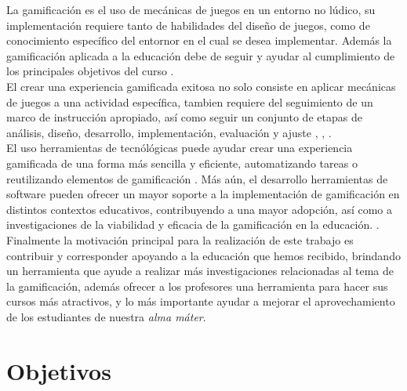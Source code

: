 
 \noindent La gamificación es el uso de mecánicas de juegos en un entorno no lúdico, su implementación requiere
 tanto de habilidades del diseño de juegos, como de conocimiento específico del entornor en el cual se desea
 implementar. Además la gamificación aplicada a la educación debe de seguir y ayudar al cumplimiento de los
 principales objetivos del curso \cite{ForTheWin}.\\ %


 \noindent El crear una experiencia gamificada exitosa no solo consiste en aplicar mecánicas de juegos a una
 actividad específica, tambien requiere del seguimiento de un marco de instrucción apropiado, así como seguir
 un conjunto de etapas de análisis, diseño, desarrollo, implementación, evaluación y ajuste
 \cite[p. 39]{Octalysis}, \cite[p. 1110]{GamInE-Learning}, \cite{ForTheWin}.\\


 \noindent El uso herramientas de tecnólógicas puede ayudar crear una experiencia gamificada de una
 forma más sencilla y eficiente, automatizando tareas o reutilizando elementos de gamificación \cite{Wood-Reiners}.
 Más aún, el desarrollo herramientas de software pueden ofrecer un mayor soporte a la implementación de
 gamificación en distintos contextos educativos, contribuyendo a una mayor adopción, así como a investigaciones
 de la viabilidad y eficacia de la gamificación en la educación. \cite[p. 10]{mappingStudy}.\\


 \noindent Finalmente la motivación principal para la realización de este trabajo es contribuir y corresponder
 apoyando a la educación que hemos recibido, brindando un herramienta que ayude a realizar más investigaciones
 relacionadas al tema de la gamificación, además ofrecer a los profesores una herramienta para hacer sus cursos más
 atractivos, y lo más importante ayudar a mejorar el aprovechamiento de los estudiantes de nuestra {\it alma máter}.



\section{Objetivos} \label{sec:objetivos}

